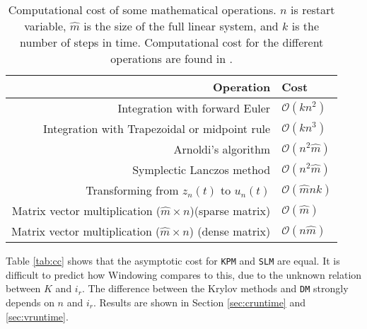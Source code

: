 \begin{table}
\caption{Computational cost of some mathematical operations. $n$ is restart variable, $\hat{m}$ is the size of the full linear system, and $k$ is the number of steps in time. Computational cost for the different operations are found in \cite{complex}. }
\centering
\begin{tabular}{r | l }
Operation & Cost \\
\hline
Integration with forward Euler & $\mathcal{O}(k n^2)$ \\
Integration with Trapezoidal or midpoint rule & $\mathcal{O}(k n^3)$ \\
Arnoldi's algorithm & $ \mathcal{ O }(n^2 \hat{m})$ \\
Symplectic Lanczos method & $ \mathcal{O}(n^2 \hat{m}) $\\
Transforming from $z_n(t)$ to $u_n(t)$ & $ \mathcal{O}(\hat{m}nk) $\\
Matrix vector multiplication ($\hat{m}\times n$)(sparse matrix) & $ \mathcal{O}(\hat{m}) $ \\
Matrix vector multiplication ($\hat{m}\times n$) (dense matrix) & $ \mathcal{O}(n \hat{m}) $
\end{tabular}


\label{tab:cd}
\end{table}

\noindent Table \ref{tab:cc} shows that the asymptotic cost for \texttt{KPM} and \texttt{SLM} are equal. It is difficult to predict how Windowing compares to this, due to the unknown relation between $K$ and $i_r$. The difference between the Krylov methods and \texttt{DM} strongly depends on $n$ and $i_r$. Results are shown in Section \ref{sec:cruntime} and \ref{sec:vruntime}. \\

